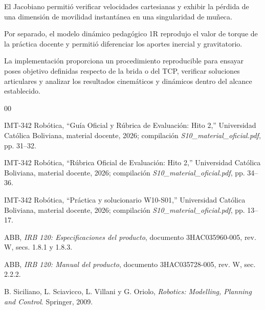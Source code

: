 \documentclass[conference]{IEEEtran}
\begin{document}
El Jacobiano permitió verificar velocidades cartesianas y exhibir la pérdida de una dimensión de movilidad instantánea en una singularidad de muñeca.

Por separado, el modelo dinámico pedagógico 1R reprodujo el valor de torque de la práctica docente y permitió diferenciar los aportes inercial y gravitatorio.

La implementación proporciona un procedimiento reproducible para ensayar poses objetivo definidas respecto de la brida o del TCP, verificar soluciones articulares y analizar los resultados cinemáticos y dinámicos dentro del alcance establecido.

\begin{thebibliography}{00}

IMT-342 Robótica,
``Guía Oficial y Rúbrica de Evaluación: Hito 2,''
Universidad Católica Boliviana, material docente, 2026;
compilación \textit{S10\_material\_oficial.pdf},
pp. 31--32.

IMT-342 Robótica,
``Rúbrica Oficial de Evaluación: Hito 2,''
Universidad Católica Boliviana, material docente, 2026;
compilación \textit{S10\_material\_oficial.pdf},
pp. 34--36.

IMT-342 Robótica,
``Práctica y solucionario W10-S01,''
Universidad Católica Boliviana, material docente, 2026;
compilación \textit{S10\_material\_oficial.pdf},
pp. 13--17.

ABB,
\textit{IRB 120: Especificaciones del producto},
documento 3HAC035960-005,
rev. W, secs. 1.8.1 y 1.8.3.

ABB,
\textit{IRB 120: Manual del producto},
documento 3HAC035728-005,
rev. W, sec. 2.2.2.

B. Siciliano, L. Sciavicco, L. Villani y G. Oriolo,
\textit{Robotics: Modelling, Planning and Control}.
Springer, 2009.

\end{thebibliography}
\end{document}
